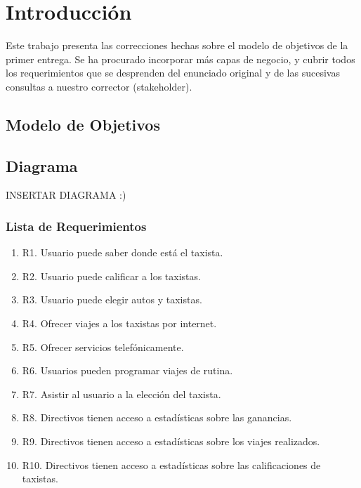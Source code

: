 \section{Introducción}

Este trabajo presenta las correcciones hechas sobre el modelo de objetivos de la primer entrega. Se ha procurado incorporar más capas de negocio, y cubrir todos los requerimientos que se desprenden del enunciado original y de las sucesivas consultas a nuestro corrector (stakeholder).


\subsection{Modelo de Objetivos}
\subsection{Diagrama}
INSERTAR DIAGRAMA :)
\subsubsection{Lista de Requerimientos}
	\begin{enumerate}
		\item \label{req:R1}R1. Usuario puede saber donde está el taxista.		
		
		\item \label{req:R2}R2. Usuario puede calificar a los taxistas.		
		
		\item \label{req:R3}R3. Usuario puede elegir autos y taxistas.		
		
		\item \label{req:R4}R4. Ofrecer viajes a los taxistas por internet.		
		
		\item \label{req:R5}R5. Ofrecer servicios telefónicamente.		

		\item \label{req:R6}R6. Usuarios pueden programar viajes de 
		rutina.		
		
		\item \label{req:R7}R7. Asistir al usuario a la elección del taxista.		
		
		\item \label{req:R8}R8. Directivos tienen acceso a estadísticas sobre las ganancias.
		
		\item \label{req:R9}R9. Directivos tienen acceso a estadísticas sobre los viajes realizados.
		
		\item \label{req:R10}R10. Directivos tienen acceso a estadísticas sobre las calificaciones de taxistas.
	\end{enumerate}
